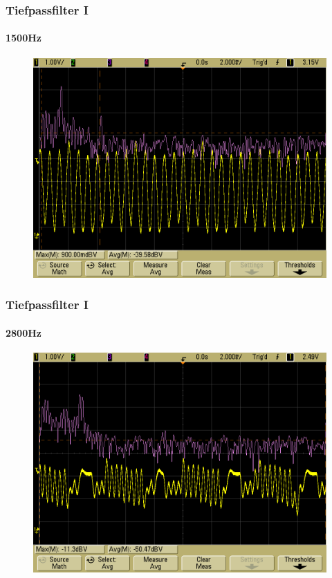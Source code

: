 \begin{frame}
    \frametitle{Tiefpassfilter I}
    \framesubtitle{1500Hz}
    \begin{figure}[H]
    \begin{center}
            \includegraphics[scale=0.15]{./img/oszi/scope_32.png}
    \end{center}
    \end{figure}  
\end{frame}
\begin{frame}
    \frametitle{Tiefpassfilter I}
    \framesubtitle{2800Hz}
    \begin{figure}[H]
    \begin{center}
            \includegraphics[scale=0.15]{./img/oszi/scope_33.png}
    \end{center}
    \end{figure}  
\end{frame}
